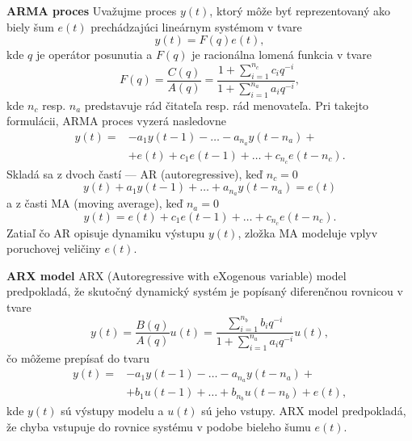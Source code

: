 \textbf{ARMA proces} 
\newline
Uvažujme proces $y(t)$, ktorý môže byť reprezentovaný ako biely šum $ e(t) $ prechádzajúci lineárnym systémom v tvare 
\begin{equation}
	y(t) = F(q)e(t),
\end{equation}
kde $q$ je operátor posunutia a $F(q)$ je racionálna lomená funkcia v tvare 
\begin{equation}
	F(q) = \frac{C(q)}{A(q)} = \frac{1 + \sum_{i=1}^{n_c} c_{i}q^{-i}}{1 + \sum_{i=1}^{n_a} a_{i}q^{-i}},
\end{equation}
kde $n_c$ resp. $n_a$ predstavuje rád čitateľa resp. rád menovateľa. Pri takejto formulácii, ARMA proces vyzerá nasledovne 
\begin{equation}
	\begin{split}
			y(t) = &-a_{1}y(t-1) - \dots -a_{n_a}y(t-n_a) + \\
				   &+e(t) + c_1e(t-1) + \dots + c_{n_c}e(t-n_c).
	\end{split} 
\end{equation}
Skladá sa z dvoch častí --- AR (autoregressive), keď $n_c = 0$
\begin{equation}
	y(t) + a_{1}y(t-1) + \dots + a_{n_a}y(t-n_a) = e(t)
\end{equation}
a z časti MA (moving average), keď $n_a = 0$
\begin{equation}
	y(t) = e(t) + c_1e(t-1) + \dots + c_{n_c}e(t-n_c).
\end{equation}
Zatiaľ čo AR opisuje dynamiku výstupu $ y(t) $, zložka MA modeluje vplyv poruchovej veličiny $ e(t) $.
 
\textbf{ARX model}
\newline
 ARX (Autoregressive with eXogenous variable) model predpokladá, že skutočný dynamický systém je popísaný diferenčnou rovnicou v tvare
 \begin{equation}
 	y(t) = \frac{B(q)}{A(q)}u(t) = \frac{\sum_{i=1}^{n_b} b_{i}q^{-i}}{1 + \sum_{i=1}^{n_a} a_{i}q^{-i}}u(t),
 \end{equation}
 čo môžeme prepísať do tvaru 
 \begin{equation}
	 \begin{split}
		 y(t) = &- a_{1}y(t-1) - \dots - a_{n_a}y(t-n_a) + \\
		 		&+ b_{1}u(t-1) + \dots + b_{n_b}u(t-n_b) + e(t), 
	 \end{split}
	 \label{eq:ARX_m} 
 \end{equation}
 kde $ y(t) $ sú výstupy modelu a $ u(t) $ sú jeho vstupy. ARX model predpokladá, že chyba vstupuje do rovnice systému v podobe bieleho šumu $ e(t) $.
 
